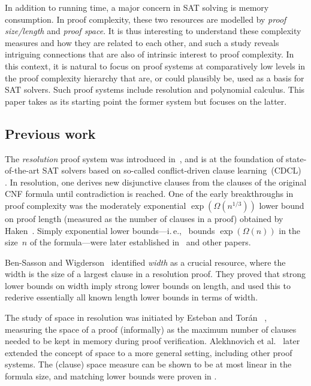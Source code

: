 \documentclass[11pt]{article}
\makeatletter
\numberwithin{equation}{section}
\theoremstyle{definition}
\theoremstyle{plain}
\newcommand{\ie}{i.\,e.}
\theoremstyle{plain}
\theoremstyle{definition}
\newcommand{\bigomega}[1]{\Omega ( #1 )}
\newcommand{\introduceterm}[1]{{\emph{#1}}}
\newcommand{\ieComma}{\ie,\ }
\newcommand{\etal}{et al.\@\xspace}
\newcommand{\mysubsection}[1]{\subsection{#1}}
\makeatother
\begin{document}
In addition to running time, a major concern in SAT solving is memory
consumption. 
In proof complexity, these two resources are modelled by
\introduceterm{proof size/length}
and
\introduceterm{proof space}.
%
It is thus interesting to understand these
complexity measures and how they are related to each other, and such a
study reveals intriguing connections that are also of intrinsic
interest to proof complexity. In this context, it is natural to focus
on proof systems at comparatively low levels in the proof complexity
hierarchy that are, or could plausibly be, used as a basis for SAT
solvers. Such proof systems include resolution and polynomial
calculus. This paper takes as its starting point the former system but
focuses on the latter.

\mysubsection{Previous work}

The \introduceterm{resolution} proof system was introduced
in~\cite{Blake37Thesis}, and is at the foundation
of state-of-the-art SAT solvers based on so-called conflict-driven
clause learning~(CDCL)~%
\cite{BS97UsingCSP,MS99Grasp,MMZZM01Engineering}.
%
In resolution, one derives new disjunctive clauses 
from the clauses of the original CNF formula until 
contradiction is reached.
One of the early breakthroughs in proof complexity was the
%
%
%
moderately exponential %
%
%
%
%
%
%
$\exp(\bigomega{n^{1/3}})$   %
lower bound on proof length 
(measured as the number of clauses in a proof)
obtained by Haken~\cite{Haken85Intractability}.
%
Simply   %
exponential lower bounds---\ieComma
bounds $\exp(\bigomega{n})$
in the size~$n$ of the formula---were 
later  established in~%
\cite{CS88ManyHard,Urquhart87HardExamples}
and other papers.


Ben-Sasson and Wigderson~\cite{BW01ShortProofs}
identified \introduceterm{width}
as a crucial resource, where the width is the
size of a largest clause in a resolution proof.
They proved that strong lower bounds on width imply strong lower
bounds on length, and used this to rederive essentially all known
length lower bounds in terms of width.

The study of space in resolution was initiated by Esteban and Tor\'an~%
\cite{ET01SpaceBounds}, measuring the space of a proof (informally) as
the maximum number of clauses needed to be kept in memory during proof
verification. Alekhnovich \etal~\cite{ABRW02SpaceComplexity}
later extended the concept of space to a more general setting,
including other proof systems.
The (clause) space measure can be shown to be at most linear in the
formula size, and matching lower bounds were proven in
\cite{ABRW02SpaceComplexity,
  BG03SpaceComplexity,
  ET01SpaceBounds}.
\end{document}
